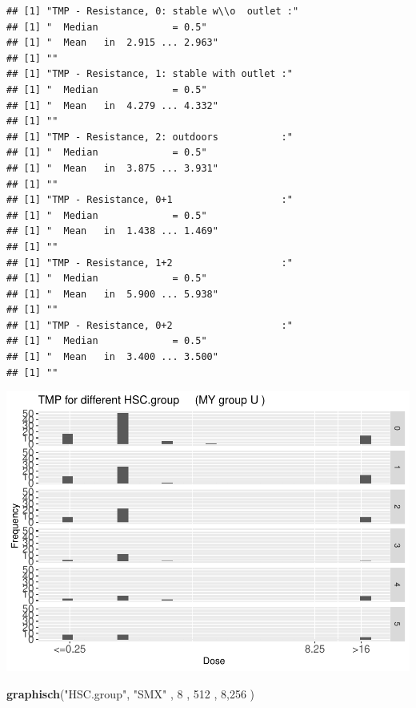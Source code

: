 \documentclass[
]{article}
\newenvironment{Shaded}{\begin{snugshade}}{\end{snugshade}}
\newcommand{\DecValTok}[1]{\textcolor[rgb]{0.00,0.00,0.81}{#1}}
\newcommand{\KeywordTok}[1]{\textcolor[rgb]{0.13,0.29,0.53}{\textbf{#1}}}
\newcommand{\NormalTok}[1]{#1}
\newcommand{\StringTok}[1]{\textcolor[rgb]{0.31,0.60,0.02}{#1}}
\begin{document}
\begin{verbatim}
## [1] "TMP - Resistance, 0: stable w\\o  outlet :"
## [1] "  Median             = 0.5"
## [1] "  Mean   in  2.915 ... 2.963"
## [1] ""
## [1] "TMP - Resistance, 1: stable with outlet :"
## [1] "  Median             = 0.5"
## [1] "  Mean   in  4.279 ... 4.332"
## [1] ""
## [1] "TMP - Resistance, 2: outdoors           :"
## [1] "  Median             = 0.5"
## [1] "  Mean   in  3.875 ... 3.931"
## [1] ""
## [1] "TMP - Resistance, 0+1                   :"
## [1] "  Median             = 0.5"
## [1] "  Mean   in  1.438 ... 1.469"
## [1] ""
## [1] "TMP - Resistance, 1+2                   :"
## [1] "  Median             = 0.5"
## [1] "  Mean   in  5.900 ... 5.938"
## [1] ""
## [1] "TMP - Resistance, 0+2                   :"
## [1] "  Median             = 0.5"
## [1] "  Mean   in  3.400 ... 3.500"
## [1] ""
\end{verbatim}

\includegraphics{Verteilungen_files/figure-latex/unnamed-chunk-55-1.pdf}

\begin{Shaded}
\begin{Highlighting}[]
  \KeywordTok{graphisch}\NormalTok{(}\StringTok{"HSC.group"}\NormalTok{, }\StringTok{"SMX"}\NormalTok{ , }\DecValTok{8}\NormalTok{    , }\DecValTok{512}\NormalTok{   ,   }\DecValTok{8}\NormalTok{,}\DecValTok{256}\NormalTok{    ) }
\end{Highlighting}
\end{Shaded}
\end{document}
